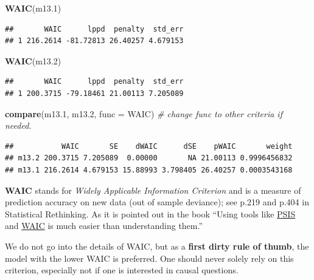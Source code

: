 \documentclass[
]{book}
\newenvironment{Shaded}{\begin{snugshade}}{\end{snugshade}}
\newcommand{\AttributeTok}[1]{\textcolor[rgb]{0.13,0.29,0.53}{#1}}
\newcommand{\CommentTok}[1]{\textcolor[rgb]{0.56,0.35,0.01}{\textit{#1}}}
\newcommand{\FloatTok}[1]{\textcolor[rgb]{0.00,0.00,0.81}{#1}}
\newcommand{\FunctionTok}[1]{\textcolor[rgb]{0.13,0.29,0.53}{\textbf{#1}}}
\newcommand{\NormalTok}[1]{#1}
\begin{document}
\begin{Shaded}
\begin{Highlighting}[]
\FunctionTok{WAIC}\NormalTok{(m13}\FloatTok{.1}\NormalTok{)}
\end{Highlighting}
\end{Shaded}

\begin{verbatim}
##       WAIC      lppd  penalty  std_err
## 1 216.2614 -81.72813 26.40257 4.679153
\end{verbatim}

\begin{Shaded}
\begin{Highlighting}[]
\FunctionTok{WAIC}\NormalTok{(m13}\FloatTok{.2}\NormalTok{)}
\end{Highlighting}
\end{Shaded}

\begin{verbatim}
##       WAIC      lppd  penalty  std_err
## 1 200.3715 -79.18461 21.00113 7.205089
\end{verbatim}

\begin{Shaded}
\begin{Highlighting}[]
\FunctionTok{compare}\NormalTok{(m13}\FloatTok{.1}\NormalTok{, m13}\FloatTok{.2}\NormalTok{, }\AttributeTok{func =}\NormalTok{ WAIC) }\CommentTok{\# change func to other criteria if needed.}
\end{Highlighting}
\end{Shaded}

\begin{verbatim}
##           WAIC       SE    dWAIC      dSE    pWAIC       weight
## m13.2 200.3715 7.205089  0.00000       NA 21.00113 0.9996456832
## m13.1 216.2614 4.679153 15.88993 3.798405 26.40257 0.0003543168
\end{verbatim}

\textbf{WAIC} stands for \emph{Widely Applicable Information Criterion} and is a
measure of prediction accuracy on new data (out of sample deviance); see
p.219 and p.404 in Statistical Rethinking. As it is pointed out in the book ``Using tools like
\href{https://sites.stat.columbia.edu/gelman/research/unpublished/VehtariGelmanGabry_PSIS_2017.pdf}{PSIS}
and \href{https://en.wikipedia.org/wiki/Watanabe\%E2\%80\%93Akaike_information_criterion}{WAIC}
is much easier than understanding them.''

We do not go into the details of WAIC, but as a \textbf{first dirty rule of thumb},
the model with the lower WAIC is preferred. One should never solely rely on
this criterion, especially not if one is interested in causal questions.
\end{document}
